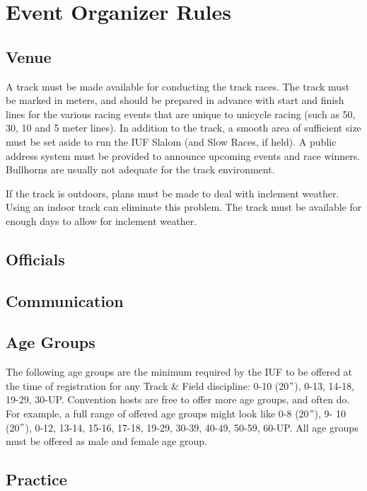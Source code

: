 \chapter{Event Organizer Rules}

\section{Venue}

A track must be made available for conducting the track races.
The track must be marked in meters, and should be prepared in advance with start and finish lines for the various racing events that are unique to unicycle racing (such as 50, 30, 10 and 5 meter lines).
In addition to the track, a smooth area of sufficient size must be set aside to run the IUF Slalom (and Slow Races, if held).
A public address system must be provided to announce upcoming events and race winners.
Bullhorns are usually not adequate for the track environment.

If the track is outdoors, plans must be made to deal with inclement weather.
Using an indoor track can eliminate this problem.
The track must be available for enough days to allow for inclement weather.
\section{Officials}

\section{Communication}

\section{Age Groups \label{subsec:track-field_racing-categories_age-groups}}
The following age groups are the minimum required by the IUF to be offered at the time of registration for any Track \& Field discipline: 0-10 (20$"$), 0-13, 14-18, 19-29, 30-UP.
Convention hosts are free to offer more age groups, and often do.
For example, a full range of offered age groups might look like 0-8 (20$"$), 9- 10 (20$"$), 0-12, 13-14, 15-16, 17-18, 19-29, 30-39, 40-49, 50-59, 60-UP.
All age groups must be offered as male and female age group.

\section{Practice}
